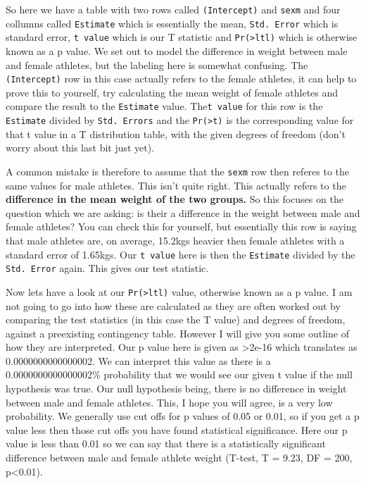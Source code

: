 \documentclass[
]{book}
\begin{document}
So here we have a table with two rows called \texttt{(Intercept)} and \texttt{sexm} and four collumns called \texttt{Estimate} which is essentially the mean, \texttt{Std.\ Error} which is standard error, \texttt{t\ value} which is our T statistic and \texttt{Pr(\textgreater{}ltl)} which is otherwise known as a p value. We set out to model the difference in weight between male and female athletes, but the labeling here is somewhat confusing. The \texttt{(Intercept)} row in this case actually refers to the female athletes, it can help to prove this to yourself, try calculating the mean weight of female athletes and compare the result to the \texttt{Estimate} value. The\texttt{t\ value} for this row is the \texttt{Estimate} divided by \texttt{Std.\ Errors} and the \texttt{Pr(\textgreater{}\textbar{}t\textbar{})} is the corresponding value for that t value in a T distribution table, with the given degrees of freedom (don't worry about this last bit just yet).

A common mistake is therefore to assume that the \texttt{sexm} row then referes to the same values for male athletes. This isn't quite right. This actually refers to the \textbf{difference in the mean weight of the two groups.} So this focuses on the question which we are asking: is their a difference in the weight between male and female athletes? You can check this for yourself, but essentially this row is saying that male athletes are, on average, 15.2kgs heavier then female athletes with a standard error of 1.65kgs. Our \texttt{t\ value} here is then the \texttt{Estimate} divided by the \texttt{Std.\ Error} again. This gives our test statistic.

Now lets have a look at our \texttt{Pr(\textgreater{}ltl)} value, otherwise known as a p value. I am not going to go into how these are calculated as they are often worked out by comparing the test statistics (in this case the T value) and degrees of freedom, against a preexisting contingency table. However I will give you some outline of how they are interpreted. Our p value here is given as \textgreater2e-16 which translates as 0.0000000000000002. We can interpret this value as there is a 0.0000000000000002\% probability that we would see our given t value if the null hypothesis was true. Our null hypothesis being, there is no difference in weight between male and female athletes. This, I hope you will agree, is a very low probability. We generally use cut offs for p values of 0.05 or 0.01, so if you get a p value less then those cut offs you have found statistical significance. Here our p value is less than 0.01 so we can say that there is a statistically significant difference between male and female athlete weight (T-test, T = 9.23, DF = 200, p\textless0.01).
\end{document}
